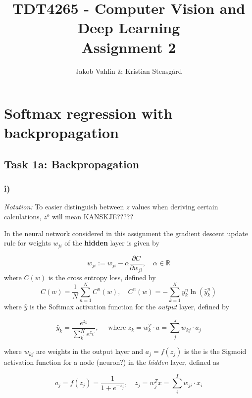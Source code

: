 \documentclass{article}
\date{}
\title{TDT4265 - Computer Vision and Deep Learning \\Assignment 2}
\author{Jakob Vahlin & Kristian Stensgård}
\begin{document}
\maketitle

\tableofcontents
\newpage

\section{Softmax regression with backpropagation}
\subsection{Task 1a: Backpropagation}

\subsubsection*{i)}
\textit{Notation:} To easier distinguish between $z$ values when deriving certain calculations, $z^o$ will mean KANSKJE?????



In the neural network considered in this assignment the gradient descent update rule for weights $w_{ji}$ of the \textbf{hidden} layer is given by

\begin{equation}
    w_{j i}:=w_{j i}-\alpha \frac{\partial C}{\partial w_{j i}} , \quad \alpha \in \mathbb{R}
    \label{eq:1a_start}
\end{equation}
where $C(w)$ is the cross entropy loss, defined by
\begin{equation}
    C(w)=\frac{1}{N} \sum_{n=1}^{N} C^{n}(w), \quad C^{n}(w)=-\sum_{k=1}^{K} y_{k}^{n} \ln \left(\hat{y}_{k}^{n}\right)
    \label{eq:cross_entropy}
\end{equation}
where $\hat{y}$ is the Softmax activation function for the \textit{output} layer, defined by

\begin{equation}
    \hat{y}_{k}=\frac{e^{z_{k}}}{\sum_{k^{\prime}}^{K} e^{z_{k^{\prime}}}}, \quad \text { where } z_{k}=w_{k}^{T} \cdot a=\sum_{j}^{J} w_{kj} \cdot a_{j}
    \label{eq:softmax}
\end{equation}

where $w_{kj}$ are weights in the output layer and $a_j = f(z_j)$ is the is the Sigmoid activation function for a node (neuron?) in the \textit{hidden} layer, defined as

\begin{equation}
    a_j =  f(z_j)=\frac{1}{1+e^{-z_j}}, \quad z_j = w_j^{T} x=\sum_{i}^{I} w_{ji} \cdot x_{i}
    \label{eq:sigmoid}
\end{equation}
\end{document}

